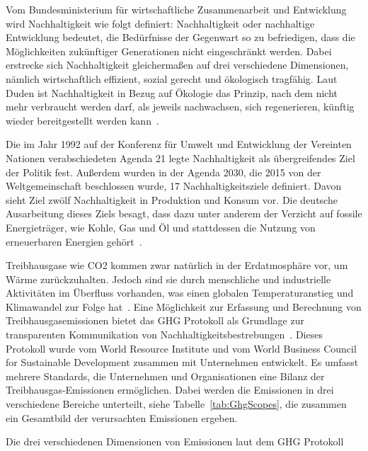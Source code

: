 Vom Bundesministerium für wirtschaftliche Zusammenarbeit und Entwicklung \cite{BundesministeriumWirtschaftlicheZusammenarbeitundEntwicklung} wird Nachhaltigkeit wie folgt definiert:
\glqq Nachhaltigkeit oder nachhaltige Entwicklung bedeutet, die Bedürfnisse der Gegenwart so zu befriedigen, dass die Möglichkeiten zukünftiger Generationen nicht eingeschränkt werden.\grqq{}
Dabei erstrecke sich Nachhaltigkeit gleichermaßen auf drei verschiedene Dimensionen, nämlich wirtschaftlich effizient, sozial gerecht und ökologisch tragfähig.
Laut Duden ist Nachhaltigkeit in Bezug auf Ökologie das \glqq Prinzip, nach dem nicht mehr verbraucht werden darf, als jeweils nachwachsen, sich regenerieren, künftig wieder bereitgestellt werden kann\grqq{}~\cite{Dudenredaktion.27.04.2018}.

Die im Jahr 1992 auf der Konferenz für Umwelt und Entwicklung der Vereinten Nationen verabschiedeten Agenda 21 legte Nachhaltigkeit als übergreifendes Ziel der Politik fest.
Außerdem wurden in der Agenda 2030, die 2015 von der Weltgemeinschaft beschlossen wurde, 17 Nachhaltigkeitsziele definiert.
Davon sieht Ziel zwölf Nachhaltigkeit in Produktion und Konsum vor.
Die deutsche Ausarbeitung dieses Ziels besagt, dass dazu unter anderem der Verzicht auf fossile Energieträger, wie Kohle, Gas und Öl und stattdessen die Nutzung von erneuerbaren Energien gehört~\cite{Bundesregierunginformiert}.

Treibhausgase wie \ac{CO2} kommen zwar natürlich in der Erdatmosphäre vor, um Wärme zurückzuhalten.
Jedoch sind sie durch menschliche und industrielle Aktivitäten im Überfluss vorhanden, was einen globalen Temperaturanstieg und Klimawandel zur Folge hat~\cite{Currie.2024}.
Eine Möglichkeit zur Erfassung und Berechnung von Treibhausgasemissionen bietet das \ac{GHG} Protokoll als Grundlage zur transparenten Kommunikation von Nachhaltigkeitsbestrebungen~\cite{WorldBusinessCouncilforSustainableDevelopment.2004}.
Dieses Protokoll wurde vom World Resource Institute und vom World Business Council for Sustainable Development zusammen mit Unternehmen entwickelt.
Es umfasst mehrere Standards, die Unternehmen und Organisationen eine Bilanz der Treibhausgas-Emissionen ermöglichen.
Dabei werden die Emissionen in drei verschiedene Bereiche unterteilt, siehe Tabelle~\ref{tab:GhgScopes}, die zusammen ein Gesamtbild der verursachten Emissionen ergeben.
\begin{table}[t]
 \centering\small
 \caption[GHG Protokoll Scopes]{Die drei verschiedenen Dimensionen von Emissionen laut dem GHG Protokoll~\cite{WorldBusinessCouncilforSustainableDevelopment.2004}}
 \label{tab:GhgScopes}
 
\end{table}

